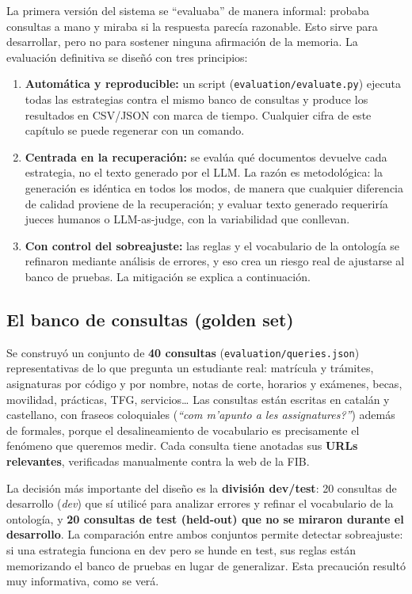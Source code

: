 \documentclass[12pt, a4paper, twoside]{report}
\begin{document}
La primera versi\'on del sistema se ``evaluaba'' de manera informal: probaba consultas a mano y miraba si la respuesta parec\'ia razonable. Esto sirve para desarrollar, pero no para sostener ninguna afirmaci\'on de la memoria. La evaluaci\'on definitiva se dise\~n\'o con tres principios:

\begin{enumerate}
  \item \textbf{Autom\'atica y reproducible:} un script (\texttt{evaluation/evaluate.py}) ejecuta todas las estrategias contra el mismo banco de consultas y produce los resultados en CSV/JSON con marca de tiempo. Cualquier cifra de este cap\'itulo se puede regenerar con un comando.
  \item \textbf{Centrada en la recuperaci\'on:} se eval\'ua qu\'e documentos devuelve cada estrategia, no el texto generado por el LLM. La raz\'on es metodol\'ogica: la generaci\'on es id\'entica en todos los modos, de manera que cualquier diferencia de calidad proviene de la recuperaci\'on; y evaluar texto generado requerir\'ia jueces humanos o LLM-as-judge, con la variabilidad que conllevan.
  \item \textbf{Con control del sobreajuste:} las reglas y el vocabulario de la ontolog\'ia se refinaron mediante an\'alisis de errores, y eso crea un riesgo real de ajustarse al banco de pruebas. La mitigaci\'on se explica a continuaci\'on.
\end{enumerate}

\subsection{El banco de consultas (golden set)}
\label{sec:golden-set}

Se construy\'o un conjunto de \textbf{40 consultas} (\texttt{evaluation/queries.json}) representativas de lo que pregunta un estudiante real: matr\'icula y tr\'amites, asignaturas por c\'odigo y por nombre, notas de corte, horarios y ex\'amenes, becas, movilidad, pr\'acticas, TFG, servicios\dots{} Las consultas est\'an escritas en catal\'an y castellano, con fraseos coloquiales (\textit{``com m'apunto a les assignatures?''}) adem\'as de formales, porque el desalineamiento de vocabulario es precisamente el fen\'omeno que queremos medir. Cada consulta tiene anotadas sus \textbf{URLs relevantes}, verificadas manualmente contra la web de la FIB.

La decisi\'on m\'as importante del dise\~no es la \textbf{divisi\'on dev/test}: 20 consultas de desarrollo (\textit{dev}) que s\'i utilic\'e para analizar errores y refinar el vocabulario de la ontolog\'ia, y \textbf{20 consultas de test (held-out) que no se miraron durante el desarrollo}. La comparaci\'on entre ambos conjuntos permite detectar sobreajuste: si una estrategia funciona en dev pero se hunde en test, sus reglas est\'an memorizando el banco de pruebas en lugar de generalizar. Esta precauci\'on result\'o muy informativa, como se ver\'a.
\end{document}
